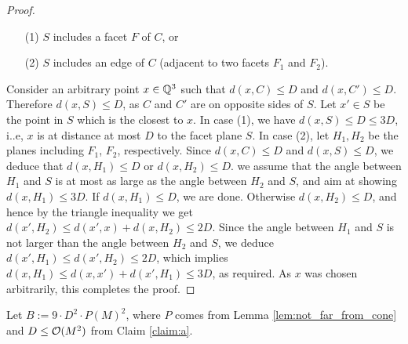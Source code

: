 \begin{appendixproof}
\begin{proof}
\begin{itemize}
\item[(1)] $S$ includes a facet $F$ of $C$, or
\item[(2)] $S$ includes an edge of $C$ (adjacent to two facets $F_1$ and $F_2$).
\end{itemize}

\noindent
Consider an arbitrary point $x\in\mathbb{Q}^3$ such that $d(x, C)\leq D$ and $d(x, C')\leq D$.
Therefore $d(x,S) \leq D$, as $C$ and $C'$ are on opposite sides of $S$.
Let $x'\in S$ be the point in $S$ which is the closest to $x$.
%
In case (1), we have $d(x,S)\leq D\leq 3D$, i..e, $x$ is at distance at most $D$ to the facet plane $S$.
In case (2), let $H_1, H_2$ be the planes including $F_1$, $F_2$, respectively.
Since $d(x, C)\leq D$ and $d(x,S) \leq D$, we deduce that $d(x,H_1)\leq D$ or $d(x,H_2)\leq D$.
\Wlog we assume that the angle between $H_1$ and $S$ is at most as large as the angle between $H_2$ and $S$,
and aim at showing $d(x, H_1) \leq 3D$.
If $d(x, H_1)\leq D$, we are done.
Otherwise $d(x, H_2) \leq D$, and hence by the triangle inequality we get
$d(x', H_2) \leq d(x', x) + d(x, H_2) \leq 2D$.
Since the angle between $H_1$ and $S$ is not larger than the angle between $H_2$ and $S$, 
we deduce $d(x', H_1) \leq d(x', H_2) \leq 2D$, which implies
$d(x, H_1)\leq d(x, x') + d(x', H_1) \leq 3D$, as required.
%
%
%
%
As $x$ was chosen arbitrarily, this completes the proof.
\end{proof}
%
Let $B:=9\cdot D^2 \cdot P(M)^2$, where $P$ comes from Lemma \ref{lem:not_far_from_cone} and
$D\leq {\cal O}(M^2)$ from Claim \ref{claim:a}.

\end{appendixproof}
